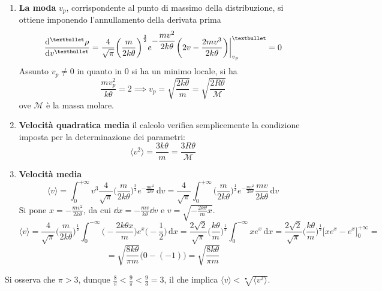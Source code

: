 \documentclass[10pt, oneside]{book}
\newcommand{\mean}[1]{\langle #1 \rangle}
\newcommand{\ds}{\displaystyle}
\newcommand{\integral}[4]{\int_{#1}^{#2} #3 \, \mathrm{d}#4}
\begin{document}
\begin{enumerate}
\item \textbf{La moda} $v_p$, corrispondente al punto di massimo della distribuzione, si ottiene imponendo l'annullamento della derivata prima 
\[\dv[•]{\rho}{v} = \frac{4}{\sqrt{\pi}} \bigg(\displaystyle \frac{m}{2k \theta}\bigg)^{ \frac{3}{2}}e^{\displaystyle - \frac{mv^2}{2k \theta}} \bigg(2v - \frac{2 m v^3}{2 k \theta}\bigg) \bigg|_{v_p}^{•} = 0\]
Assunto $v_p \neq 0$ in quanto in $0$ si ha un minimo locale, si ha
\[\frac{mv_p^2}{k \theta} = 2 \implies v_p = \sqrt{\frac{2 k \theta}{m}} = \sqrt{\frac{2 R \theta}{\mathcal{M}}}\]
ove $\mathcal{M}$ è la massa molare.
\item \textbf{Velocità quadratica media} il calcolo verifica semplicemente la condizione imposta per la determinazione dei parametri: 
\[\mean{v^2} = \frac{3 k \theta}{m} = \frac{3 R \theta}{\mathcal{M}}\]
\item \textbf{Velocità media}
\[\mean{v} = \int_{0}^{+\infty} v^3 \frac{4}{\sqrt{\pi}} \bigg(\displaystyle \frac{m}{2k \theta}\bigg)^{ \frac{3}{2}} e^{\displaystyle - \frac{mv^2}{2k \theta}}\, \mathrm{d}v = \frac{4}{\sqrt{\pi}} \integral{0}{+\infty}{\bigg( \ds \frac{m}{2k \theta}\bigg)^{\frac{1}{2}}e^{\displaystyle - \frac{mv^2}{2k \theta}} \frac{mv}{2k \theta}}{v}\]
Si pone $\ds x = - \frac{mv^2}{2k\theta}$, da cui $\dd{x} = - \frac{mv}{k\theta}\dd{v}$ e $\ds v = \sqrt{- \frac{2k\theta}{m} x}$.
\[\mean{v} = \frac{4}{\sqrt{\pi}} \bigg(\displaystyle \frac{m}{2k \theta}\bigg)^{ \frac{1}{2}} \integral{0}{-\infty}{\bigg(- \frac{2k\theta x}{m}\bigg) e^x \bigg(- \frac{1}{2}\bigg)}{x} = \frac{2\sqrt{2}}{\sqrt{\pi}} \bigg(\frac{k \theta}{m}\bigg)^{\frac{1}{2}} \int_{0}^{-\infty} x e^x \, \mathrm{d}x = \frac{2\sqrt{2}}{\sqrt{\pi}} \bigg(\frac{k \theta}{m}\bigg)^{\frac{1}{2}} \bigg[x e^x - e^x \bigg]_0^{+\infty} = \]
\[= \sqrt{\frac{8 k \theta}{\pi m}} \big(0 - (-1) \big) = \sqrt{\frac{8 k \theta}{\pi m}}\]
\end{enumerate}
Si osserva che $\pi > 3$, dunque $\ds \frac{8}{\pi} < \frac{9}{\pi} < \frac{9}{3} = 3$, il che implica $\ds \mean{v} < \sqrt[•]{\mean{v^2}}$.
\end{document}
